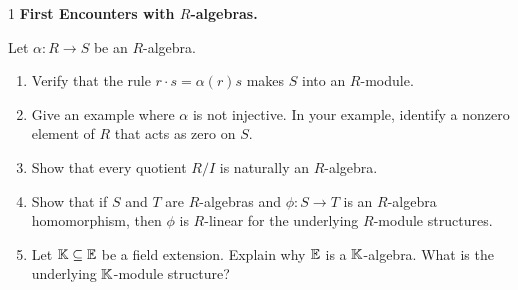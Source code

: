 \documentclass[Notebook.tex]{subfiles}
\begin{document}
\hrulefill

\newpage

\begin{problem}{1}
    \textbf{First Encounters with $R$-algebras.} 
    
    Let $\alpha:R\to S$ be an $R$-algebra.
    \begin{enumerate}
        \item Verify that the rule $r\cdot s=\alpha(r)s$ makes $S$ into an $R$-module.
        \item Give an example where $\alpha$ is not injective. In your example, identify a nonzero element of $R$ that acts as zero on $S$.
        \item Show that every quotient $R/I$ is naturally an $R$-algebra.
        \item Show that if $S$ and $T$ are $R$-algebras and $\phi:S\to T$ is an $R$-algebra homomorphism, then $\phi$ is $R$-linear for the underlying $R$-module structures.
        \item Let $\mathbb K \subseteq \mathbb E$ be a field extension. Explain why $\mathbb E$ is a $\mathbb K$-algebra. What is the underlying $\mathbb K$-module structure?
    \end{enumerate}
\end{problem}
\end{document}
